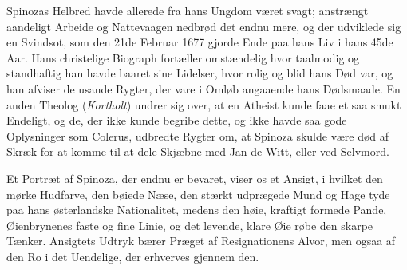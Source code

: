 \documentclass[12pt,a4paper]{book}
\newcommand{\opage}[1]{\marginnote{\footnotesize\textit{[#1]}}}
\begin{document}
Spinozas Helbred havde allerede fra hans Ungdom været svagt; anstrængt
aandeligt Arbeide og Nattevaagen nedbrød det endnu mere, og der udviklede
sig en Svindsot, som den 21de Februar 1677 gjorde Ende paa hans Liv i hans
45de Aar. Hans christelige Biograph fortæller omstændelig hvor taalmodig
og standhaftig han havde baaret sine Lidelser, hvor rolig og blid hans Død
var, og han afviser de usande Rygter, der vare i Omløb angaaende hans
Dødsmaade. En
\opage{34} \setcounter{footnote}{0}%
anden Theolog (\emph{Kortholt}) undrer sig over, at en Atheist kunde faae
et saa smukt Endeligt, og de, der ikke kunde begribe dette, og ikke havde
saa gode Oplysninger som Colerus, udbredte Rygter om, at Spinoza skulde
være død af Skræk for at komme til at dele Skjæbne med Jan de Witt, eller
ved Selvmord.

Et Portræt af Spinoza, der endnu er bevaret, viser os et Ansigt, i hvilket
den mørke Hudfarve, den bøiede Næse, den stærkt udprægede Mund og Hage
tyde paa hans østerlandske Nationalitet, medens den høie, kraftigt formede
Pande, Øienbrynenes faste og fine Linie, og det levende, klare Øie røbe
den skarpe Tænker. Ansigtets Udtryk bærer Præget af Resignationens Alvor,
men ogsaa af den Ro i det Uendelige, der erhverves gjennem den.
\end{document}
